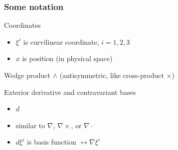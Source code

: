 \documentclass[aspectratio=169]{beamer}
\begin{document}
\begin{frame}[t]
  \frametitle{Some notation}
    \begin{block}{Coordinates}
      \begin{itemize}%
      \item $\xi^i$ is curvilinear coordinate, $i = 1, 2, 3$
      \item $x$ is position (in physical space)
      \end{itemize}
    \end{block}
    \begin{block}{Wedge product}
       $\wedge$ (antisymmetric, like cross-product $\times$)
    \end{block}
    \begin{block}{Exterior derivative and contravariant bases}
      \begin{itemize}
        \item $d$ 
        \item similar to $\nabla$, $\nabla \times$, or $\nabla \cdot$
        \item $d \xi^i$ is basis function $\leftrightarrow \nabla \xi^i$
    \end{itemize}
  \end{block}
\end{frame}
\end{document}
